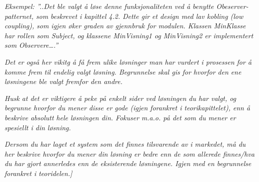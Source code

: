 \documentclass[../main.tex]{subfiles}
\begin{document}
{\itshape\color{blue}
Eksempel: ''..Det ble valgt {\aa} l{\o}se denne funksjonaliteten ved {\aa} benytte Obeserver-patternet, som beskrevet i
kapittel 4.2. Dette gir et design med lav kobling (low coupling), som igjen {\o}ker graden av gjennbruk for modulen.
Klassen MinKlasse har rollen som Subject, og klassene MinVisning1 og MinVisning2 er implementert som
Observere{\dots}.''}

{\itshape\color{blue}
Det er ogs{\aa} her vikitg {\aa} f{\aa} frem ulike l{\o}sninger man har vurdert i prosessen for {\aa} komme frem til
endelig valgt l{\o}sning. Begrunnelse skal gis for hvorfor den ene l{\o}sningene ble valgt fremfor den andre.}

{\itshape\color{blue}
Husk at det er viktigere {\aa} peke p{\aa} enkelt sider ved l{\o}sningen du har valgt, og begrunne hvorfor du mener
disse er gode (igjen forankret i teorikapittelet), enn {\aa} beskrive absolutt hele l{\o}sningen din. Fokuser m.a.o.
p{\aa} det som du mener er spesiellt i din l{\o}sning.}

{\itshape\color{blue}
Dersom du har laget et system som det finnes tilsvarende av i markedet, m{\aa} du her beskrive hvorfor du mener din
l{\o}sning er bedre enn de som allerede finnes/hva du har gjort annerledes enn de eksisterende l{\o}sningene. Igjen med
en begrunnelse forankret i teoridelen.]}


\bigskip
\end{document}
